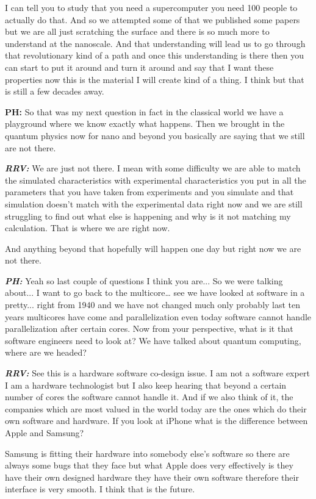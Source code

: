 I can tell you to study that you need a supercomputer you need 100 people to actually do that. And so we attempted some of that we published some papers but we are all just scratching the surface and there is so much more to understand at the nanoscale. And that understanding will lead us to go through that revolutionary kind of a path and once this understanding is there then you can start to put it around and turn it around and say that I want these properties now this is the material I will create kind of a thing. I think but that is still a few decades away.

\textbf{PH:} So that was my next question in fact in the classical world we have a playground where we know exactly what happens. Then we brought in the quantum physics now for nano and beyond you basically are saying that we still are not there.

\textbf{\textit{RRV:}} We are just not there. I mean with some difficulty we are able to match the simulated characteristics with experimental characteristics you put in all the parameters that you have taken from experiments and you simulate and that simulation doesn’t match with the experimental data right now and we are still struggling to find out what else is happening and why is it not matching my calculation. That is where we are right now. 

And anything beyond that hopefully will happen one day but right now we are not there. 

\textbf{\textit{PH:}} Yeah so last couple of questions I think you are... So we were talking about... I want to go back to the multicore… see we have looked at software in a pretty... right from 1940 and we have not changed much only probably last ten years multicores have come and parallelization even today software cannot handle parallelization after certain cores. Now from your perspective, what is it that software engineers need to look at? We have talked about quantum computing, where are we headed?

\textbf{\textit{RRV:}} See this is a hardware software co-design issue. I am not a software expert I am a hardware technologist but I also keep hearing that beyond a certain number of cores the software cannot handle it. And if we also think of it, the companies which are most valued in the world today are the ones which do their own software and hardware. If you look at iPhone what is the difference between Apple and Samsung?

Samsung is fitting their hardware into somebody else’s software so there are always some bugs that they face but what Apple does very effectively is they have their own designed hardware they have their own software therefore their interface is very smooth. I think that is the future. 

